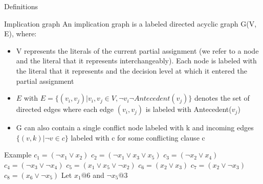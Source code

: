 \documentclass{beamer}
\begin{document}
\begin{frame}{Definitions}
\begin{block}{Implication graph}
An implication graph is a labeled directed acyclic graph G(V, E), where:
\begin{itemize}
\item V represents the literals of the current partial assignment (we refer to a node and the literal that it represents interchangeably). Each node is labeled with the literal that it represents and the decision level at which it entered the partial assignment
\item $E$ with $E = \{(v_i , v_j ) | v_i, v_j \in V, \lnot v_i \lnot Antecedent(v_j)\}$ denotes the set of directed edges where each edge $(v_i, v_j)$ is labeled with Antecedent($v_j$)
\item G can also contain a single conflict node labeled with k and incoming edges $\{(v, k) | \lnot v \in c\}$ labeled with c for some conflicting clause c
\end{itemize}
\end{block}
\end{frame}

\begin{frame}{Example}
$c_1 = (\lnot x_1 \vee x_2 )$\newline
$c_2 = (\lnot x_1 \vee x_3 \vee x_5 )$\newline
$c_3 = (\lnot x_2 \vee x_4 )$\newline
$c_4 = (\lnot x_3 \vee \lnot x_4 )$\newline
$c_5 = (x_1 \vee x_5 \vee \lnot x_2 )$\newline
$c_6 = (x_2 \vee x_3 )$\newline
$c_7 = (x_2 \vee \lnot x_3 )$\newline
$c_8 = (x_6 \vee \lnot x_5 )$\newline
Let $x_1@6$ and $\lnot x_5@3$
\end{frame}
\end{document}
